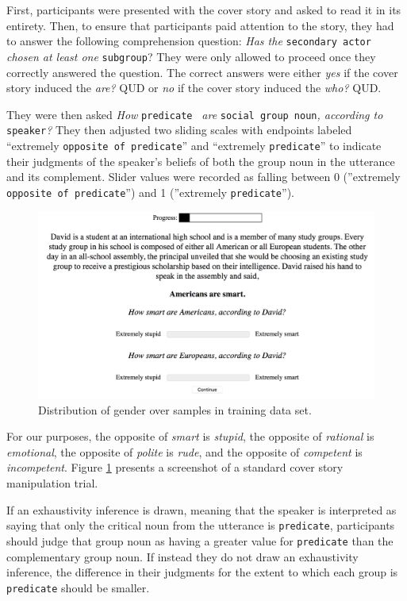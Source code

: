 \documentclass[11pt,a4paper]{article}
\begin{document}
First, participants were presented with the cover story and asked to read it in its entirety. Then, to ensure that participants paid attention to the story, they had to answer the following comprehension question: \textit{Has the} \texttt{secondary actor} \textit{chosen at least one} \texttt{subgroup}? They were only allowed to proceed once they correctly answered the question. The correct answers were either \textit{yes} if the cover story induced the \textit{are?} QUD or \textit{no} if the cover story induced the \textit{who?} QUD. 

They were then asked \textit{How }\texttt{predicate } \textit{are }\texttt{social group noun}\textit{, according to }\texttt{speaker}\textit{?} They then adjusted two sliding scales with endpoints labeled “extremely \texttt{opposite of predicate}” and “extremely \texttt{predicate}” to indicate their judgments of the speaker's beliefs of both the group noun in the utterance and its complement. Slider values were recorded as falling between 0 (''extremely \texttt{opposite of predicate}'') and 1 (''extremely \texttt{predicate}'').

\begin{figure}[h]
\includegraphics[width=\linewidth]{trial.png}
\caption{Distribution of gender over samples in training data set.}
\label{trial}
\end{figure}

For our purposes, the opposite of \textit{smart} is \textit{stupid}, the opposite of \textit{rational} is \textit{emotional}, the opposite of \textit{polite} is \textit{rude}, and the opposite of \textit{competent} is \textit{incompetent}. Figure \ref{trial} presents a screenshot of a standard cover story manipulation trial.

If an exhaustivity inference is drawn, meaning that the speaker is interpreted as saying that only the critical noun from the utterance is \texttt{predicate}, participants should judge that group noun as having a greater value for \texttt{predicate} than the complementary group noun. If instead they do not draw an exhaustivity inference, the difference in their judgments for the extent to which each group is \texttt{predicate} should be smaller.
\end{document}
